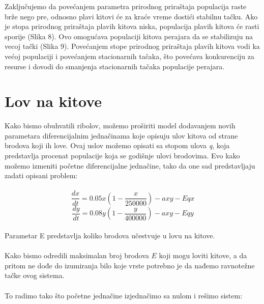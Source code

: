 \documentclass[a4paper]{article}
\begin{document}
{	Zaključujemo da povećanjem parametra prirodnog priraštaja populacija raste brže nego pre, odnosno plavi kitovi će za kraće vreme dostići stabilnu tačku. Ako je stopa prirodnog priraštaja plavih kitova niska, populacija plavih kitova će rasti sporije (Slika 8). Ovo omogućava populaciji kitova perajara da se stabilizuju na vecoj tački (Slika 9). Povećanjem stope prirodnog priraštaja plavih kitova vodi ka većoj populaciji i povećanjem stacionarnih tačaka, što povećava konkurenciju za resurse i dovodi do smanjenja stacionarnih tačaka populacije perajara. 
	

	
	\newpage
	
	\section{Lov na kitove}
	\label{sec: lov-na-kitove}
	
	Kako bismo obuhvatili ribolov, možemo proširiti model dodavanjem novih parametara diferencijalnim jednačinama koje opisuju ulov kitova od strane brodova koji ih love. Ovaj uslov možemo opisati sa stopom ulova \textit{q}, koja predstavlja procenat populacije koja se godišnje ulovi brodovima. Evo kako možemo izmeniti početne diferencijalne jednačine, tako da one sad predstavljaju zadati opisani problem:\\ 
	\\

	\[
		\frac{dx}{dt} = 0.05x(1 - \frac{x}{250000}) - axy - Eqx
	\]
	\[
		\frac{dy}{dt} = 0.08y(1 - \frac{y}{400000}) - axy - Eqy
	\]
	\\

	Parametar E predstavlja koliko brodova učestvuje u lovu na kitove.\\
	\\
	Kako bismo odredili maksimalan broj brodova $E$ koji mogu loviti kitove, a da pritom ne dođe do izumiranja bilo koje vrste potrebno je da nađemo ravnotežne tačke ovog sistema.\\ 
	\\
	To radimo tako što početne jednačine izjednačimo sa nulom i rešimo sistem:
	
}
\end{document}
